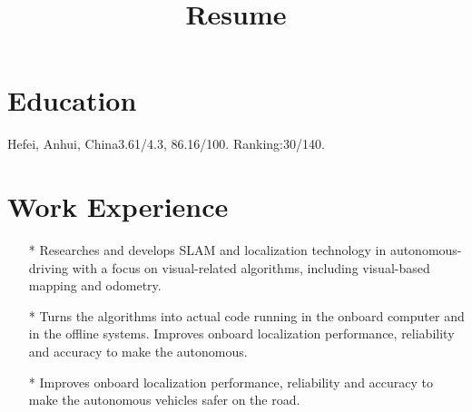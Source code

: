 \documentclass[10pt,letterpaper,sans]{moderncv} %
\title{Resume}
\begin{document}
\makecvtitle %

\vspace{-0.3in}

\section{Education}


{Hefei, Anhui, China}{}{3.61/4.3, 86.16/100. Ranking:30/140. \newline
}

\section{Work Experience}

\begin{itemize}
    \item[*] Researches and develops SLAM and localization technology in autonomous-driving with a focus on visual-related algorithms, including visual-based mapping and odometry.
    \item[*] Turns the algorithms into actual code running in the onboard computer and in the offline systems. Improves onboard localization performance, reliability and accuracy to make the autonomous.
    \item[*] Improves onboard localization performance, reliability and accuracy to make the autonomous vehicles safer on the road.
\end{itemize}
\end{document}

